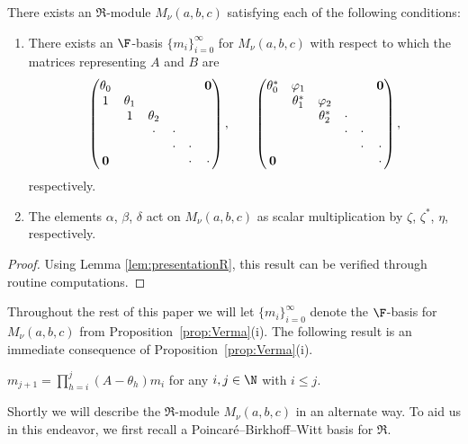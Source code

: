 \begin{Proposition}\label{prop:Verma}There exists an $\Re$-module $M_\nu (a,b,c)$ satisfying each of the following conditions:
\begin{enumerate}\itemsep=0pt
\item[{\rm (i)}] There exists an $\F$-basis $\{m_i\}_{i=0}^\infty$ for $M_\nu (a,b,c)$ with respect to which the matrices representing $A$ and $B$ are
\begin{gather*}
\begin{pmatrix}
\theta_0 & & & & &{\bf 0}
\\
1 &\theta_1
\\
&1 &\theta_2
 \\
 & &\cdot &\cdot
 \\
& & &\cdot &\cdot
 \\
 {\bf 0} & & & &\cdot &\cdot
\end{pmatrix},
\qquad
\begin{pmatrix}
\theta_0^* &\varphi_1 & & & &{\bf 0}
\\
 &\theta_1^* &\varphi_2
\\
 & &\theta_2^* &\cdot
 \\
 & & &\cdot &\cdot
 \\
& & & &\cdot &\cdot
 \\
 {\bf 0} & & & & &\cdot
\end{pmatrix},
\end{gather*}
respectively.

\item[{\rm (ii)}] The elements $\alpha$, $\beta$, $\delta$ act on $M_\nu (a,b,c)$ as scalar multiplication by $\zeta$, $\zeta^*$, $\eta$, respectively.
\end{enumerate}
\end{Proposition}
\begin{proof}Using Lemma \ref{lem:presentationR}, this result can be verified through routine computations.
\end{proof}

Throughout the rest of this paper we will let $\{m_i\}_{i=0}^\infty$ denote the $\F$-basis for $M_\nu(a,b,c)$ from Proposition~\ref{prop:Verma}(i). The following result is an immediate consequence of Proposition~\ref{prop:Verma}(i).

\begin{Lemma}\label{lem:mi}$m_{j+1}=\prod\limits_{h=i}^j (A-\theta_h)m_i$ for any $i,j\in \N$ with $ i\leq j$.
\end{Lemma}

Shortly we will describe the $\Re$-module $M_\nu(a,b,c)$ in an alternate way. To aid us in this endeavor, we first recall a Poincar\'{e}--Birkhoff--Witt basis for $\Re$.

